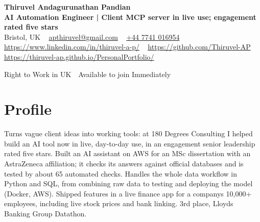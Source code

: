 \documentclass[a4paper,11pt]{article}
\begin{document}
\begin{center}
  {\LARGE\bfseries Thiruvel Andagurunathan Pandian} \\[3pt]
  {\color{headernavy}\small\textbf{AI Automation Engineer | Client MCP server in live use; engagement rated five stars}} \\[3pt]
  {\small
  Bristol, UK\nobreak\ \,\textbar\, \href{mailto:apthiruvel@gmail.com}{apthiruvel@gmail.com}\nobreak\ \,\textbar\, \href{tel:+447741016954}{+44 7741 016954}\nobreak\ \,\textbar\, \href{https://www.linkedin.com/in/thiruvel-a-p/}{https://www.linkedin.com/in/thiruvel-a-p/}\nobreak\ \,\textbar\, \href{https://github.com/Thiruvel-AP}{https://github.com/Thiruvel-AP}\nobreak\ \,\textbar\, \href{https://thiruvel-ap.github.io/PersonalPortfolio/}{https://thiruvel-ap.github.io/PersonalPortfolio/}}\par\vspace{4pt}
  \noindent{} Right to Work in UK \,\textbar\, Available to join Immediately
\end{center}

\section{Profile}
Turns vague client ideas into working tools: at 180 Degrees Consulting I helped build an AI tool now in live, day-to-day use, in an engagement senior leadership rated five stars. Built an AI assistant on AWS for an MSc dissertation with an AstraZeneca affiliation; it checks its answers against official databases and is tested by about 65 automated checks. Handles the whole data workflow in Python and SQL, from combining raw data to testing and deploying the model (Docker, AWS). Shipped features in a live finance app for a company\textquotesingle{}s 10,000+ employees, including live stock prices and bank linking. 3rd place, Lloyd\textquotesingle{}s Banking Group Datathon.
\end{document}
